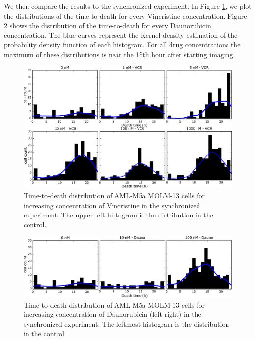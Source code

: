 \documentclass[pdftex,12pt,a4paper]{report}
\begin{document}
We then compare the results to the synchronized experiment. In Figure \ref{fig:ttd_scatter_vcr_syn}, we plot the distributions of the time-to-death for every Vincristine concentration. Figure \ref{fig:ttd_scatter_dauno_syn} shows the distribution of the time-to-death for every Daunorubicin concentration. The blue curves represent the Kernel density estimation of the probability density function of each histogram. For all drug concentrations the maximum of these distributions is near the 15th hour after starting imaging.

\begin{figure}[H]
\centering
\includegraphics[width=\textwidth]{images/ttd/syn/vcr_all.pdf}
\caption[Distribution of TTD for every Vincristine concentration in the synchronized experiment]{Time-to-death distribution of AML-M5a MOLM-13 cells for increasing concentration of Vincristine in the synchronized experiment. The upper left histogram is the distribution in the control.}
\label{fig:ttd_scatter_vcr_syn}
\end{figure}

\begin{figure}[H]
\centering
\includegraphics[width=\textwidth]{images/ttd/syn/dauno_all.pdf}
\caption[Distribution of TTD for every Daunorubicin concentration in the synchronized experiment]{Time-to-death distribution of AML-M5a MOLM-13 cells for increasing concentration of Daunorubicin (left-right) in the synchronized experiment. The leftmost histogram is the distribution in the control}
\label{fig:ttd_scatter_dauno_syn}
\end{figure}
\end{document}
